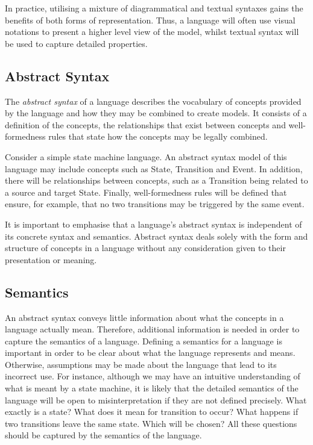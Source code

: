 In practice, utilising a mixture of diagrammatical and textual
syntaxes gains the benefits of both forms of representation. Thus,
a language will often use visual notations to present a higher
level view of the model, whilst textual syntax will be used to
capture detailed properties.

\subsection{Abstract Syntax}

The {\em abstract syntax} of a language describes the vocabulary
of concepts provided by the language and how they may be combined
to create models. It consists of a definition of the concepts, the
relationships that exist between concepts and well-formedness
rules that state how the concepts may be legally combined.

Consider a simple state machine language. An abstract syntax model
of this language may include concepts such as State, Transition
and Event. In addition, there will be relationships between
concepts, such as a Transition being related to a source and
target State. Finally, well-formedness rules will be defined that
ensure, for example, that no two transitions may be triggered by
the same event.

It is important to emphasise that a language's abstract syntax is
independent of its concrete syntax and semantics. Abstract syntax
deals solely with the form and structure of concepts in a language
without any consideration given to their presentation or meaning.

\subsection{Semantics}

An abstract syntax conveys little information about what the
concepts in a language actually mean. Therefore, additional
information is needed in order to capture the semantics of a
language. Defining a semantics for a language is important in
order to be clear about what the language represents and means.
Otherwise, assumptions may be made about the language that lead to
its incorrect use. For instance, although we may have an intuitive
understanding of what is meant by a state machine, it is likely
that the detailed semantics of the language will be open to
misinterpretation if they are not defined precisely. What exactly
is a state? What does it mean for transition to occur? What
happens if two transitions leave the same state. Which will be
chosen? All these questions should be captured by the semantics of
the language.


